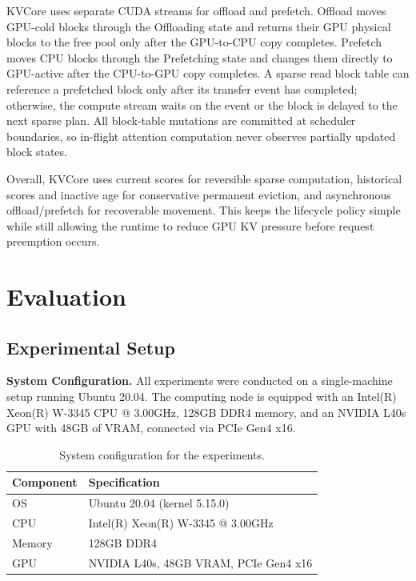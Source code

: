 \documentclass[sigplan,10pt,review,anonymous]{acmart}
\begin{document}
KVCore uses separate CUDA streams for offload and prefetch.
Offload moves GPU-cold blocks through the Offloading state and returns their GPU physical blocks to the free pool only after the GPU-to-CPU copy completes.
Prefetch moves CPU blocks through the Prefetching state and changes them directly to GPU-active after the CPU-to-GPU copy completes.
A sparse read block table can reference a prefetched block only after its transfer event has completed; otherwise, the compute stream waits on the event or the block is delayed to the next sparse plan.
All block-table mutations are committed at scheduler boundaries, so in-flight attention computation never observes partially updated block states.

Overall, KVCore uses current scores for reversible sparse computation, historical scores and inactive age for conservative permanent eviction, and asynchronous offload/prefetch for recoverable movement.
This keeps the lifecycle policy simple while still allowing the runtime to reduce GPU KV pressure before request preemption occurs.




\section{Evaluation}
\subsection{Experimental Setup}

\textbf{System Configuration.} 
All experiments were conducted on a single-machine setup running Ubuntu 20.04. 
The computing node is equipped with an Intel(R) Xeon(R) W-3345 CPU @ 3.00GHz, 128GB DDR4 memory, and an NVIDIA L40s GPU with 48GB of VRAM, connected via PCIe Gen4 x16. 

\begin{table}[h!]
\centering
\caption{System configuration for the experiments.}
\begin{tabular}{ll}
\hline
Component & Specification \\
\hline
OS & Ubuntu 20.04 (kernel 5.15.0) \\
CPU & Intel(R) Xeon(R) W-3345 @ 3.00GHz \\
Memory & 128GB DDR4 \\
GPU & NVIDIA L40s, 48GB VRAM, PCIe Gen4 x16 \\
\hline
\end{tabular}
\end{table}
\end{document}
